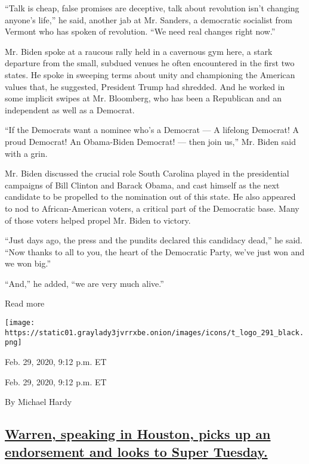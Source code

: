 ``Talk is cheap, false promises are deceptive, talk about revolution
isn't changing anyone's life,'' he said, another jab at Mr. Sanders, a
democratic socialist from Vermont who has spoken of revolution. ``We
need real changes right now.''

Mr. Biden spoke at a raucous rally held in a cavernous gym here, a stark
departure from the small, subdued venues he often encountered in the
first two states. He spoke in sweeping terms about unity and championing
the American values that, he suggested, President Trump had shredded.
And he worked in some implicit swipes at Mr. Bloomberg, who has been a
Republican and an independent as well as a Democrat.

``If the Democrats want a nominee who's a Democrat --- A lifelong
Democrat! A proud Democrat! An Obama-Biden Democrat! --- then join us,''
Mr. Biden said with a grin.

Mr. Biden discussed the crucial role South Carolina played in the
presidential campaigns of Bill Clinton and Barack Obama, and cast
himself as the next candidate to be propelled to the nomination out of
this state. He also appeared to nod to African-American voters, a
critical part of the Democratic base. Many of those voters helped propel
Mr. Biden to victory.

``Just days ago, the press and the pundits declared this candidacy
dead,'' he said. ``Now thanks to all to you, the heart of the Democratic
Party, we've just won and we won big.''

``And,'' he added, ``we are very much alive.''

Read more

\texttt{[image: https://static01.graylady3jvrrxbe.onion/images/icons/t\_logo\_291\_black.png]}

Feb. 29, 2020, 9:12 p.m. ET

Feb. 29, 2020, 9:12 p.m. ET

By Michael Hardy

\hypertarget{warren-speaking-in-houston-picks-up-an-endorsement-and-looks-to-super-tuesday}{%
\subsection{\texorpdfstring{\protect\hyperlink{elizabeth-warren-houston}{Warren,
speaking in Houston, picks up an endorsement and looks to Super
Tuesday.}}{Warren, speaking in Houston, picks up an endorsement and looks to Super Tuesday.}}\label{warren-speaking-in-houston-picks-up-an-endorsement-and-looks-to-super-tuesday}}

